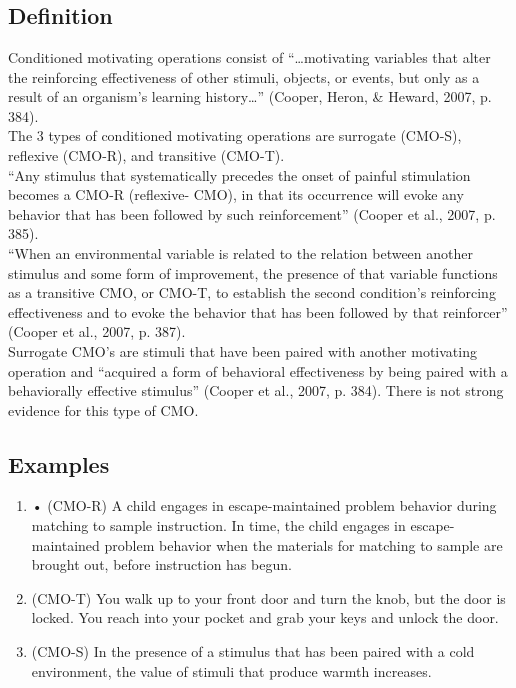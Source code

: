 %
%
%
%
%
%
%
%
%
\section[\fourFKTwentyEight{}]{\fourFKTwentyEight{}%
              }
\subsection{Definition}
Conditioned motivating operations consist of ``…motivating variables that alter the reinforcing effectiveness of other stimuli, objects, or events, but only as a result of an organism's learning history…'' (Cooper, Heron, \& Heward, 2007, p. 384).\\

The 3 types of conditioned motivating operations are surrogate (CMO-S), reflexive (CMO-R), and transitive (CMO-T).\\

``Any stimulus that systematically precedes the onset of painful stimulation becomes a CMO-R (reflexive- CMO), in that its occurrence will evoke any behavior that has been followed by such reinforcement'' (Cooper et al., 2007, p. 385).\\

``When an environmental variable is related to the relation between another stimulus and some form of improvement, the presence of that variable functions as a transitive CMO, or CMO-T, to establish the second condition's reinforcing effectiveness and to evoke the behavior that has been followed by that reinforcer'' (Cooper et al., 2007, p. 387).\\

Surrogate CMO's are stimuli that have been paired with another motivating operation and ``acquired a form of behavioral effectiveness by being paired with a behaviorally effective stimulus'' (Cooper et al., 2007, p. 384). There is not strong evidence for this type of CMO.
%
\subsection{Examples}
\begin{enumerate}
\item     • (CMO-R) A child engages in escape-maintained problem behavior during matching to sample instruction. In time, the child engages in escape-maintained problem behavior when the materials for matching to sample are brought out, before instruction has begun. 
\item (CMO-T) You walk up to your front door and turn the knob, but the door is locked. You reach into your pocket and grab your keys and unlock the door. 
\item (CMO-S) In the presence of a stimulus that has been paired with a cold environment, the value of stimuli that produce warmth increases.
%
\end{enumerate}
%
